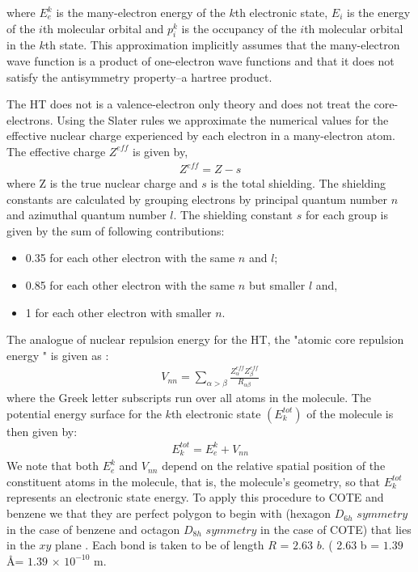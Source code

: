 \documentclass[9pt,twocolumn,twoside]{optica}
\begin{document}
where $E_e^k $ is the many-electron energy of the $k$th electronic state, $E_i$ is the energy of the $i$th molecular orbital and $p_i^k $ is the
occupancy of the $i$th molecular orbital in the $k$th state. This approximation implicitly assumes that the many-electron wave function is a product of one-electron wave functions and that it does not satisfy the antisymmetry property--a hartree product.

The HT does not is a valence-electron only theory and does not treat the core-electrons. Using the Slater rules we approximate the numerical values for the effective nuclear charge experienced by each electron in a many-electron atom. The
effective charge $Z^{eff}$ is given by,
\begin{align}
Z^{eff}=Z-s
\label{eq:EE1}
\end{align}
where Z is the true nuclear charge and $s$ is the total shielding. The shielding constants are calculated by grouping electrons by principal quantum number $n$ and azimuthal quantum number $l$. The shielding constant $s$ for each group is
given by the sum of following contributions:
\begin{itemize}
\item 0.35 for each other electron with the same $n$ and $l$; 
\item 0.85 for each other electron with the same $n$ but smaller $l$ and,
\item 1 for each other electron with smaller $n$.
\end{itemize}
The analogue of nuclear repulsion energy for the HT, the "atomic core repulsion energy " is given as :
\begin{align}
V_{nn}= \sum_{\alpha > \beta} \frac{Z^{eff}_\alpha Z^{eff}_\beta}{R_{\alpha \beta}}
\label{eq:EE2}
\end{align}
 where the Greek letter subscripts run over all atoms in the
molecule. The potential energy surface for the $k$th electronic state $(E^{tot}_k )$
of the molecule is then given by:
\begin{align}
E^{tot}_k = E^{k}_e + V_{nn}
\label{eq:EE3}
\end{align}
We note that both $E_e^k$ and $V_{nn}$ depend on the relative spatial
position of the constituent atoms in the molecule, that is, the molecule’s geometry, so that $E^{tot}_k$ represents an electronic state energy. To apply this procedure to COTE and benzene we that they are perfect polygon to begin with (hexagon $D_{6h}\,\, symmetry$  in the case of benzene and octagon $D_{8h} \,\, symmetry$ in the case of COTE) that lies in the $xy$ plane . Each bond is taken to be of length $R$ = $2.63$ $b$. ( 2.63 b = $1.39 $ \AA  = $ 1.39$ $ \times $ $10^{-10}$ m. 
\end{document}
